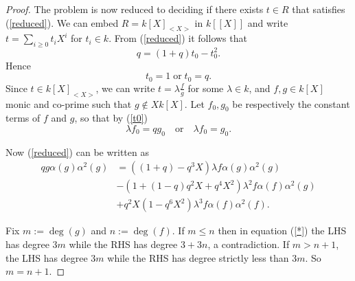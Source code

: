 \documentclass[a4paper, 11pt]{article}
\theoremstyle{definition}
\begin{document}
\begin{proof}
\noindent The problem is now reduced to deciding if there exists $t\in R$ that satisfies (\ref{reduced}). We can embed $R=k[X]_{<X>}$ in $k[[X]]$ and write $t=\displaystyle \sum_{i\geq 0} t_iX^i$ for $t_i \in k$. From (\ref{reduced}) it follows that
$$q=(1+q)t_0-t_0^2.$$
Hence
\begin{equation}\label{t0}t_0=1 \; \mbox{or}\; t_0=q.
\end{equation}
\noindent Since $t\in k[X]_{<X>}$, we can write $t=\lambda\frac{f}{g}$ for some $\lambda\in k$, and  $f,g\in k[X]$ monic and co-prime such that $g\notin X k[X]$.  Let $f_0, g_0$ be respectively the constant terms of $f$ and $g$, so that by (\ref{t0})
\begin{equation}\label{degree0}
\lambda f_0= qg_0\quad \mbox{or}\quad \lambda f_0=g_0.
\end{equation}


\noindent Now (\ref{reduced}) can be written as
\begin{equation}\label{*}
\begin{split}
qg\alpha(g)\alpha^2(g)&=\left((1+q)-q^3X\right)\lambda f\alpha(g)\alpha^2(g)\\
&-\left(1+(1-q)q^2X+q^4X^2\right)\lambda^2f\alpha(f)\alpha^2(g)\\
&+q^2X(1-q^6X^2)\lambda^3f\alpha(f)\alpha^2(f).
\end{split}
\end{equation}%

\noindent Fix $m := \deg(g)$ and $n := \deg(f)$. If $m\leq n$ then in equation (\ref{*}) the LHS has degree $3m$ while the RHS has degree $3+3n$, a contradiction. If $m>n+1$, the LHS has degree $3m$ while the RHS has degree strictly less than $3m$. So $m=n+1$.

\medskip


\end{proof}
\end{document}
